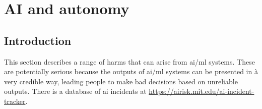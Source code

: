 %
%
\chapter{AI and autonomy} \label{bkm:autonomy}
%

%
%
%
%
\section{Introduction}
This section describes a range of harms that can arise from \gls{ai}/\gls{ml} systems. These are potentially serious because the outputs of \gls{ai}/\gls{ml} systems can be presented in à very credible way, leading people to make bad decisions based on unreliable outputs. There is a database of \gls{ai} incidents at \url{https://airisk.mit.edu/ai-incident-tracker}.
